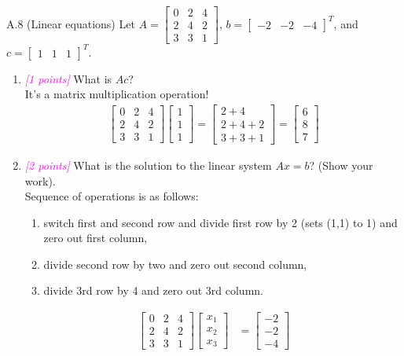 \documentclass{article}
\newcommand{\1}{\mathbf{1}}
\newcommand{\points}[1]{\small\textcolor{magenta}{\emph{[#1 points]}} \normalsize}
\begin{document}
A.8 (Linear equations) Let $A = \begin{bmatrix} 0 & 2 & 4 \\ 2 & 4 & 2 \\ 3 & 3 & 1 \end{bmatrix}$, $b = \begin{bmatrix} -2 & -2 & -4 \end{bmatrix}^T$, and $c=\begin{bmatrix} 1 & 1 & 1 \end{bmatrix}^T$.
\begin{enumerate}
	\item \points{1} What is $Ac$? \\ It's a matrix multiplication operation!
	\begin{align*}
	    \begin{bmatrix} 0 & 2 & 4 \\ 2 & 4 & 2 \\ 3 & 3 & 1 \end{bmatrix} \begin{bmatrix} 1 \\ 1 \\ 1 \end{bmatrix} = \begin{bmatrix} 2+4 \\ 2+4+2 \\ 3+3+1 \end{bmatrix} = \begin{bmatrix} 6 \\ 8 \\ 7 \end{bmatrix}
	\end{align*}
	\item \points{2} What is the solution to the linear system $Ax = b$? (Show your work). \\
	Sequence of operations is as follows: 
	\begin{enumerate}
	    \item switch first and second row and divide first row by 2 (sets (1,1) to 1) and zero out first column,
	    \item divide second row by two and zero out second column, 
	    \item divide 3rd row by 4 and zero out 3rd column.
	\end{enumerate}
	\begin{align*}
	    \begin{bmatrix} 0 & 2 & 4 \\ 2 & 4 & 2 \\ 3 & 3 & 1 \end{bmatrix} \begin{bmatrix} x_1 \\ x_2 \\ x_3 \end{bmatrix} &= \begin{bmatrix} -2 \\ -2 \\ -4 \end{bmatrix} \\

\end{align*}
\end{enumerate}
\end{document}
